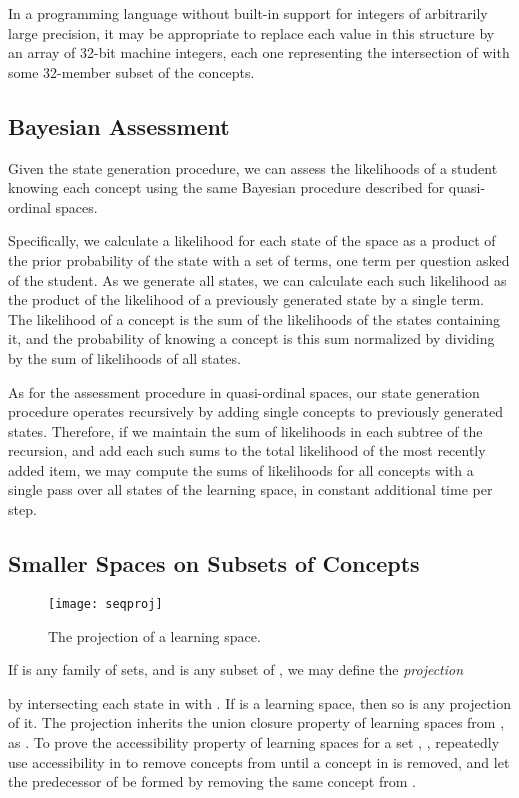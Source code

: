 \documentclass[11pt]{llncs}
\begin{document}
{In a programming language without built-in support for integers of arbitrarily large precision, it may be appropriate to replace each value  in this structure by an array of 32-bit machine integers, each one representing the intersection of  with some 32-member subset of the concepts.

\subsection{Bayesian Assessment}

Given the state generation procedure, we can assess the likelihoods of a student knowing each concept using the same Bayesian procedure described for quasi-ordinal spaces.

Specifically, we calculate a likelihood for each state of the space as a product of the prior probability of the state with a set of terms, one term per question asked of the student. As we generate all states, we can calculate each such likelihood as the product of the likelihood of a previously generated state by a single term. The likelihood of a concept is the sum of the likelihoods of the states containing it, and the probability of knowing a concept is this sum normalized by dividing by the sum of likelihoods of all states.

As for the assessment procedure in quasi-ordinal spaces, our state generation procedure operates recursively by adding single concepts to previously generated states. Therefore, if we maintain the sum of likelihoods in each subtree of the recursion, and add each such sums to the total likelihood of the most recently added item, we may compute the sums of likelihoods for all concepts with a single pass over all states of the learning space, in constant additional time per step.

\subsection{Smaller Spaces on Subsets of Concepts}

\begin{figure}[t]
\centering\texttt{[image: seqproj]}
\caption{The projection of a learning space.}
\label{fig:seqproj}
\end{figure}

If  is any family of sets, and  is any subset of , we may define
the \emph{projection}

by intersecting each state in  with .
If  is a learning space, then so is any projection of it. The projection inherits the union closure property of learning spaces from ,
as . To prove the accessibility property of learning spaces
for a set , , repeatedly use accessibility in  to remove concepts from  until a concept in  is removed, and let the predecessor of  be formed by removing the same concept from .

}
\end{document}
